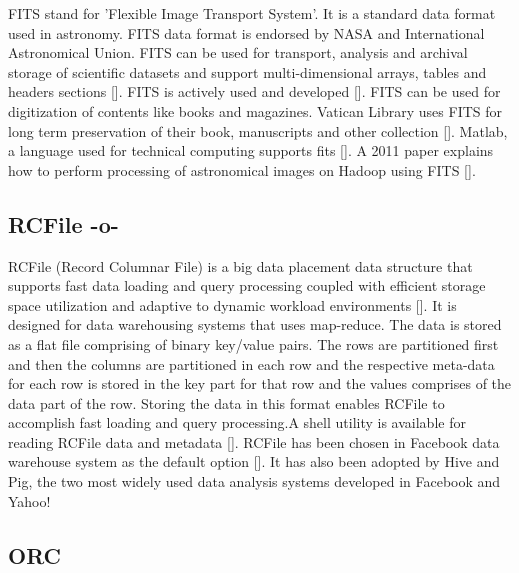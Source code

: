 FITS stand for 'Flexible Image Transport System'. It is a standard
data format used in astronomy. FITS data format is endorsed by NASA
and International Astronomical Union. FITS can be used for transport,
analysis and archival storage of scientific datasets and support
multi-dimensional arrays, tables and headers
sections [\cite{www-fits-nasa}].  FITS is actively used and
developed [\cite{www-news-fits-2016}].  FITS can be used for
digitization of contents like books and magazines. Vatican Library
uses FITS for long term preservation of their book, manuscripts and
other collection [\cite{www-fits-vatican-library}]. Matlab, a language
used for technical computing supports fits [\cite{www-fits-matlab}]. A
2011 paper explains how to perform processing of astronomical images
on Hadoop using FITS [\cite{paper-fits-2011}].



\subsection{RCFile -o-}

RCFile (Record Columnar File) is a big data placement data structure
that supports fast data loading and query processing coupled with
efficient storage space utilization and adaptive to dynamic workload
environments [\cite{www-rcfile-wiki}].  It is designed for data
warehousing systems that uses map-reduce. The data is stored as a flat
file comprising of binary key/value pairs. The rows are partitioned
first and then the columns are partitioned in each row and the
respective meta-data for each row is stored in the key part for that
row and the values comprises of the data part of the row. Storing the
data in this format enables RCFile to accomplish fast loading and
query processing.A shell utility is available for reading RCFile data
and metadata [\cite{www-rcfile-cat}]. RCFile has been chosen in Facebook
data warehouse system as the default option [\cite{he2011rcfile}]. It
has also been adopted by Hive and Pig, the two most widely used data
analysis systems developed in Facebook and Yahoo!



\subsection{ORC}

